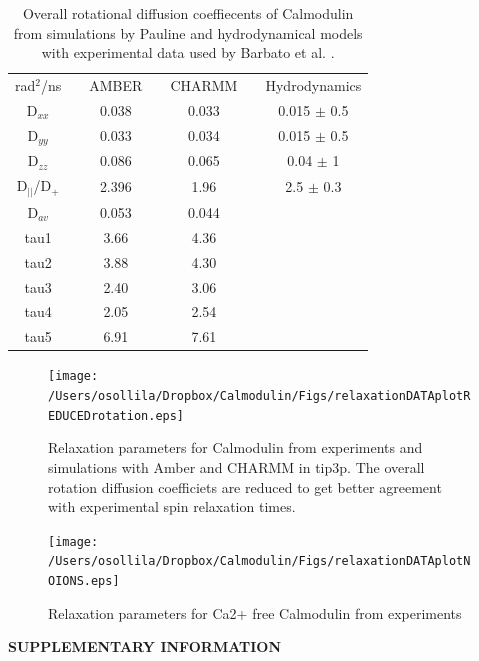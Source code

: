 \documentclass[pre,aps,floatfix,authordate1-4]{revtex4-1}
\begin{document}
\begin{table}[htb]
\centering
\caption{ Overall rotational diffusion coeffiecents of Calmodulin from
  simulations by Pauline and hydrodynamical models with experimental data
  used by Barbato et al. \cite{barbato92}.
}\label{ROTdiffCOEFFS}
\begin{tabular}{c c c c c c c}
rad$^2$/ns &   &  AMBER & &  CHARMM & &  Hydrodynamics \\
D$_{xx}$ &     &  0.038  & &  0.033  & & 0.015 $\pm$ 0.5\\
D$_{yy}$  &    &  0.033  & &  0.034  & & 0.015 $\pm$ 0.5\\
D$_{zz}$   &   &  0.086  & &  0.065  & & 0.04 $\pm$ 1\\
D$_||$/D$_+$ & & 2.396	& &  1.96   & & 2.5 $\pm$ 0.3\\
D$_{av}$    &  & 0.053   & &  0.044  & & \\
tau1     &    & 3.66    & &  4.36   & & \\
tau2     &    & 3.88    & &  4.30   & & \\
tau3     &    & 2.40    & &  3.06   & & \\
tau4      &   & 2.05	& &  2.54   & & \\
tau5      &   & 6.91	& &  7.61   & & \\
\end{tabular}
\end{table} 

\begin{figure}[!h]
  \texttt{[image: /Users/osollila/Dropbox/Calmodulin/Figs/relaxationDATAplotREDUCEDrotation.eps]}%
  \caption{Relaxation parameters for Calmodulin from
    experiments and simulations with Amber and CHARMM in tip3p.
    The overall rotation diffusion coefficiets are reduced to
    get better agreement with experimental spin relaxation times.
    \label{hexPHASEdimensionsPLOT}}%
\end{figure}

\begin{figure}[!h]
  \texttt{[image: /Users/osollila/Dropbox/Calmodulin/Figs/relaxationDATAplotNOIONS.eps]}%
  \caption{Relaxation parameters for Ca2+ free Calmodulin from
    experiments \cite{tjandra95} \label{hexPHASEdimensionsPLOT}}%
\end{figure}

\begin{acknowledgments}
\end{acknowledgments}



\newpage
\appendix
\begin{center}
{\bf SUPPLEMENTARY INFORMATION}
\end{center}


\end{document}
